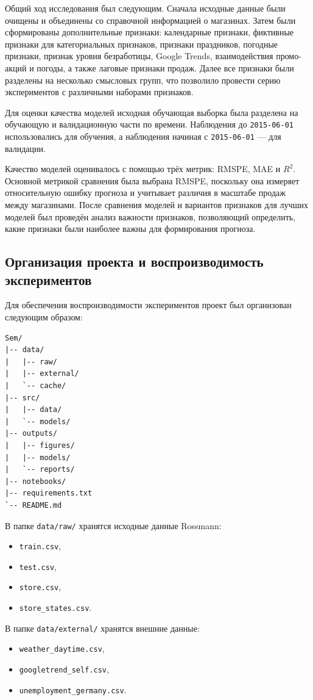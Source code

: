 \documentclass[12pt,a4paper]{article}
\numberwithin{equation}{section}
\begin{document}
Общий ход исследования был следующим. Сначала исходные данные были очищены и объединены со справочной информацией о магазинах. Затем были сформированы дополнительные признаки: календарные признаки, фиктивные признаки для категориальных признаков, признаки праздников, погодные признаки, признак уровня безработицы, Google Trends, взаимодействия промо-акций и погоды, а также лаговые признаки продаж. Далее все признаки были разделены на несколько смысловых групп, что позволило провести серию экспериментов с различными наборами признаков.

Для оценки качества моделей исходная обучающая выборка была разделена на обучающую и валидационную части по времени. Наблюдения до \texttt{2015-06-01} использовались для обучения, а наблюдения начиная с \texttt{2015-06-01} --- для валидации.

Качество моделей оценивалось с помощью трёх метрик: RMSPE, MAE и $R^2$. Основной метрикой сравнения была выбрана RMSPE, поскольку она измеряет относительную ошибку прогноза и учитывает различия в масштабе продаж между магазинами. После сравнения моделей и вариантов признаков для лучших моделей был проведён анализ важности признаков, позволяющий определить, какие признаки были наиболее важны для формирования прогноза.

\subsection{Организация проекта и воспроизводимость экспериментов}

Для обеспечения воспроизводимости экспериментов проект был организован следующим образом:

\begin{verbatim}
Sem/
|-- data/
|   |-- raw/
|   |-- external/
|   `-- cache/
|-- src/
|   |-- data/
|   `-- models/
|-- outputs/
|   |-- figures/
|   |-- models/
|   `-- reports/
|-- notebooks/
|-- requirements.txt
`-- README.md
\end{verbatim}

В папке \texttt{data/raw/} хранятся исходные данные Rossmann:
\begin{itemize}
    \item \texttt{train.csv},
    \item \texttt{test.csv},
    \item \texttt{store.csv},
    \item \texttt{store\_states.csv}.
\end{itemize}

В папке \texttt{data/external/} хранятся внешние данные:
\begin{itemize}
    \item \texttt{weather\_daytime.csv},
    \item \texttt{googletrend\_self.csv},
    \item \texttt{unemployment\_germany.csv}.
\end{itemize}
\end{document}
